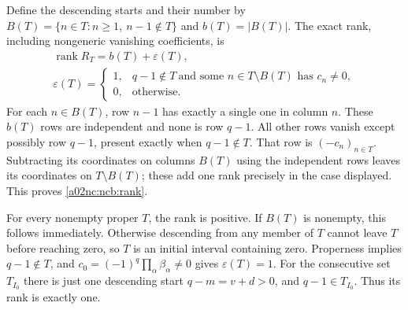 \documentclass[11pt,a4paper]{article}
\begin{document}
Define the descending starts and their number by
$B(T)=\{n\in T:n\geq1,\ n-1\notin T\}$ and $b(T)=|B(T)|$.
The exact rank, including nongeneric vanishing coefficients, is
\begin{equation}\tag{NCB32}\label{a02nc:ncb:rank}
\begin{gathered}
\operatorname{rank}R_T=b(T)+\varepsilon(T),\\
\varepsilon(T)=
\begin{cases}
1,&q-1\notin T\ \text{and some }n\in T\setminus B(T)
                                    \text{ has }c_n\ne0,\\
0,&\text{otherwise}.
\end{cases}
\end{gathered}
\end{equation}
For each $n\in B(T)$, row $n-1$ has exactly a single one in column
$n$. These $b(T)$ rows are independent and none is row $q-1$.
All other rows vanish except possibly row $q-1$, present exactly when
$q-1\notin T$. That row is $(-c_n)_{n\in T}$.
Subtracting its coordinates on columns $B(T)$ using the independent
rows leaves its coordinates on $T\setminus B(T)$; these add one rank
precisely in the case displayed. This proves \eqref{a02nc:ncb:rank}.

For every nonempty proper $T$, the rank is positive. If $B(T)$ is
nonempty, this follows immediately. Otherwise descending from any
member of $T$ cannot leave $T$ before reaching zero, so $T$ is an
initial interval containing zero. Properness implies $q-1\notin T$,
and $c_0=(-1)^q\prod_\alpha\beta_\alpha\ne0$ gives
$\varepsilon(T)=1$. For the consecutive set $T_{I_0}$ there is just
one descending start $q-m=v+d>0$, and $q-1\in T_{I_0}$.
Thus its rank is exactly one.
\end{document}
